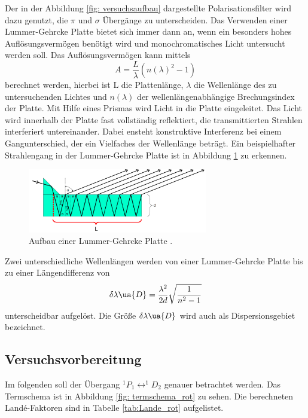 Der in der Abbildung \ref{fig: versuchsaufbau} dargestellte Polarisationsfilter wird dazu genutzt, %
die $\pi$ und $\sigma$ Übergänge zu unterscheiden. Das Verwenden einer Lummer-Gehrcke Platte
bietet sich immer dann an, wenn ein besonders hohes Auflösungsvermögen benötigt wird
und monochromatisches Licht untersucht werden soll.
Das Auflösungsvermögen kann mittels
\begin{equation}
  \label{eq: auflösungsvermoegen_lummer}
  A=\frac{L}{\lambda}(n(\lambda)^2-1)
\end{equation}
berechnet werden, hierbei ist L die Plattenlänge, $\lambda$ die Wellenlänge
des zu untersuchenden Lichtes und $n(\lambda)$ der wellenlängenabhängige
Brechungsindex der Platte. Mit Hilfe eines Prismas wird Licht in die Platte eingeleitet. %
Das Licht wird innerhalb der Platte fast vollständig reflektiert, die transmittierten
Strahlen interferiert untereinander. Dabei ensteht konstruktive Interferenz bei einem Gangunterschied,
der ein Vielfaches der Wellenlänge beträgt. 
Ein beispielhafter Strahlengang in der Lummer-Gehrcke Platte ist in Abbildung \ref{fig: lummer} zu erkennen.
\FloatBarrier
\begin{figure}[h]
  \centering
  \includegraphics[width=0.7\textwidth]{pics/lummer.png}
  \caption{Aufbau einer Lummer-Gehrcke Platte \cite{anleitung27}.}
  \label{fig: lummer}
\end{figure}
\FloatBarrier
Zwei unterschiedliche Wellenlängen werden von einer Lummer-Gehrcke Platte bis zu
einer Längendifferenz von
\begin{equation}
  \label{eq: lummer_wellendif}
  \delta \lambda\ua{D}=\frac{\lambda^2}{2 d} \sqrt{\frac{1}{n^2-1}}
\end{equation}
unterscheidbar aufgelöst. Die Größe $\delta \lambda\ua{D}$ wird auch als Dispersionsgebiet
bezeichnet.

\subsection{Versuchsvorbereitung}

Im folgenden soll der Übergang  $^1P_1\leftrightarrow ^1\!\!D_2$ genauer betrachtet werden.
Das Termschema ist in Abbildung \ref{fig: termschema_rot} zu sehen. Die berechneten Landé-Faktoren %
sind in Tabelle \ref{tab:Lande_rot} aufgelistet.

